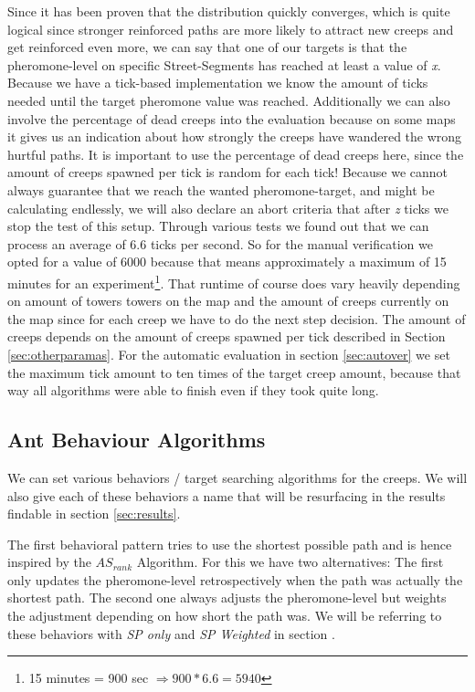 Since it has been proven that the distribution quickly converges\cite[P. 15]{maniezzo2002ant}, which is quite logical since stronger reinforced paths are more likely to attract new creeps and get reinforced even more, we can say that one of our targets is that the pheromone-level on specific Street-Segments has reached at least a value of \textit{x}.
Because we have a tick-based implementation we know the amount of ticks needed until the target pheromone value was reached. Additionally we can also involve the percentage of dead creeps into the evaluation because on some maps it gives us an indication about how strongly the creeps have wandered  the wrong hurtful paths. It is important to use the percentage of dead creeps here, since the amount of creeps spawned per tick is random for each tick!
Because we cannot always guarantee that we reach the wanted pheromone-target, and might be calculating endlessly, we will also declare an abort criteria that after \textit{z} ticks we stop the test of this setup. Through various tests we found out that we can process an average of 6.6 ticks per second. So for the manual verification we opted for a value of 6000 because that means approximately a maximum of 15 minutes for an experiment\footnote{15 minutes = 900 sec  $\Rightarrow 900 * 6.6 = 5940$}. That runtime of course does vary heavily depending on amount of towers towers on the map and the amount of creeps currently on the map since for each creep we have to do the next step decision. The amount of creeps depends on the amount of creeps spawned per tick described in Section \ref{sec:otherparamas}.
For the automatic evaluation in section \ref{sec:autover} we set the maximum tick amount to ten times of the target creep amount, because that way all algorithms were able to finish even if they took quite long. 


\subsection{Ant Behaviour Algorithms}
\label{sec:behavior}
We can set various behaviors / target searching algorithms for the creeps. We will also give each of these behaviors a name that will be resurfacing in the results findable in section \ref{sec:results}.

The first behavioral pattern tries to use the shortest possible path and is hence inspired by the $AS_{rank}$ Algorithm\cite{zecchin2007ant}.
For this we have two alternatives: The first only updates the pheromone-level retrospectively when the path was actually the shortest path. The second one always adjusts the pheromone-level but weights the adjustment depending on how short the path was.
We will be referring to these behaviors with \textit{SP only} and \textit{SP Weighted} in section .


